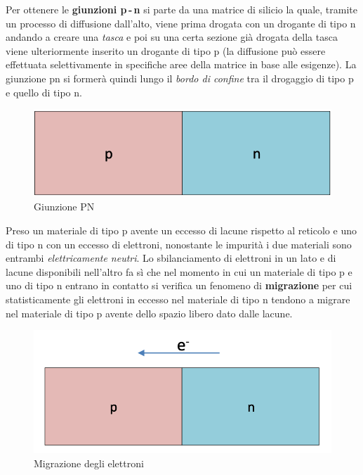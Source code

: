 \documentclass[12pt, a4paper]{report}
\begin{document}
Per ottenere le \textbf{giunzioni p\,-\,n} si parte da una matrice di silicio la quale, tramite un processo di diffusione dall'alto, viene prima drogata con un drogante di tipo n andando a creare una \textit{tasca} e poi su una certa sezione già drogata della tasca viene ulteriormente inserito un drogante di tipo p (la diffusione può essere effettuata selettivamente in specifiche aree della matrice in base alle esigenze). La giunzione pn si formerà quindi lungo il \textit{bordo di confine} tra il drogaggio di tipo p e quello di tipo n.
\begin{figure}[ht]
\centering
\includegraphics[scale=0.4,angle=0]{giunzione_pn.png}
\caption{Giunzione PN}
\end{figure}

Preso un materiale di tipo p avente un eccesso di lacune rispetto al reticolo e uno di tipo n con un eccesso di elettroni, nonostante le impurità i due materiali sono entrambi \textit{elettricamente neutri}. Lo sbilanciamento di elettroni in un lato e di lacune disponibili nell'altro fa sì che nel momento in cui un materiale di tipo p e uno di tipo n entrano in contatto si verifica un fenomeno di \textbf{migrazione} per cui statisticamente gli elettroni in eccesso nel materiale di tipo n tendono a migrare nel materiale di tipo p avente dello spazio libero dato dalle lacune.
\begin{figure}[h]
\centering
\includegraphics[scale=0.4,angle=0]{giunzione_pn_elettroni.png}
\caption{Migrazione degli elettroni}
\end{figure}
\end{document}
